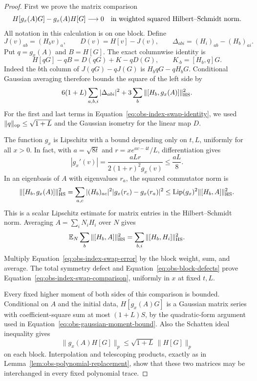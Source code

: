 \begin{proof}
First we prove the matrix comparison
\begin{equation}\label{eq:obs-index-swap-comparison}
 H[g_x(A)G]-g_x(A)H[G]\longrightarrow0
 \quad\hbox{in weighted squared Hilbert--Schmidt norm}.
\end{equation}
All notation in this calculation is on one block.  Define
\[
 J(v)_{ab}=(H_bv)_a,
 \qquad D(v)=H[v]-J(v),
 \qquad \Delta_{abi}=(H_i)_{ab}-(H_b)_{ai}.
\]
Put $q=g_x(A)$ and $B=H[G]$.  The exact columnwise identity is
\begin{equation}\label{eq:obs-index-swap-identity}
 H[qG]-qB=D(qG)+K-qD(G),
 \qquad K_{\cdot b}=[H_b,q]G.
\end{equation}
Indeed the $b$th column of $J(qG)-qJ(G)$ is
$H_bqG-qH_bG$.  Conditional Gaussian averaging therefore bounds
the square of the left side by
\begin{equation}\label{eq:obs-index-swap-error}
 6(1+L)\sum_{a,b,i}|\Delta_{abi}|^2
       +3\sum_b\|[H_b,g_x(A)]\|_{\mathrm{HS}}^2.
\end{equation}
For the first and last terms in
Equation~\eqref{eq:obs-index-swap-identity}, we used
$\|q\|_{\mathrm{op}}\le\sqrt{1+L}$ and the Gaussian isometry for the
linear map $D$.

The function $g_x$ is Lipschitz with a bound depending only on
$t,L$, uniformly for all $x>0$.  In fact, with
$a=\sqrt{8t}$ and $r=xe^{av-4t}/L$, differentiation gives
\[
 |g_x'(v)|
 =\frac{aLr}{2(1+r)^2g_x(v)}\le\frac{aL}{8}.
\]
In an eigenbasis of $A$ with eigenvalues $r_a$, the squared
commutator norm is
\[
 \|[H_b,g_x(A)]\|_{\mathrm{HS}}^2
 =\sum_{a,c}|(H_b)_{ac}|^2|g_x(r_c)-g_x(r_a)|^2
 \le\operatorname{Lip}(g_x)^2\|[H_b,A]\|_{\mathrm{HS}}^2.
\]
This is a scalar Lipschitz estimate for matrix entries in the
Hilbert--Schmidt norm.  Averaging $A=\sum_iN_iH_i$ over $N$ gives
\[
 \mathbb E_N\sum_b\|[H_b,A]\|_{\mathrm{HS}}^2
 =\sum_{b,i}\|[H_b,H_i]\|_{\mathrm{HS}}^2.
\]
Multiply Equation~\eqref{eq:obs-index-swap-error} by the block
weight, sum, and average.  The total symmetry defect and
Equation~\eqref{eq:obs-block-defects} prove
Equation~\eqref{eq:obs-index-swap-comparison}, uniformly in $x$ at
fixed $t,L$.

Every fixed higher moment of both sides of this comparison is
bounded.  Conditional on $A$ and the initial data,
$H[g_x(A)G]$ is a Gaussian matrix series with coefficient-square
sum at most $(1+L)S$, by the quadratic-form argument used in
Equation~\eqref{eq:obs-gaussian-moment-bound}.  Also the Schatten
ideal inequality gives
\[
 \|g_x(A)H[G]\|_{p}\le\sqrt{1+L}\,\|H[G]\|_{p}
\]
on each block.  Interpolation and telescoping products, exactly as
in Lemma~\ref{lem:obs-polynomial-replacement}, show that these
two matrices may be interchanged in every fixed polynomial trace.


\end{proof}
